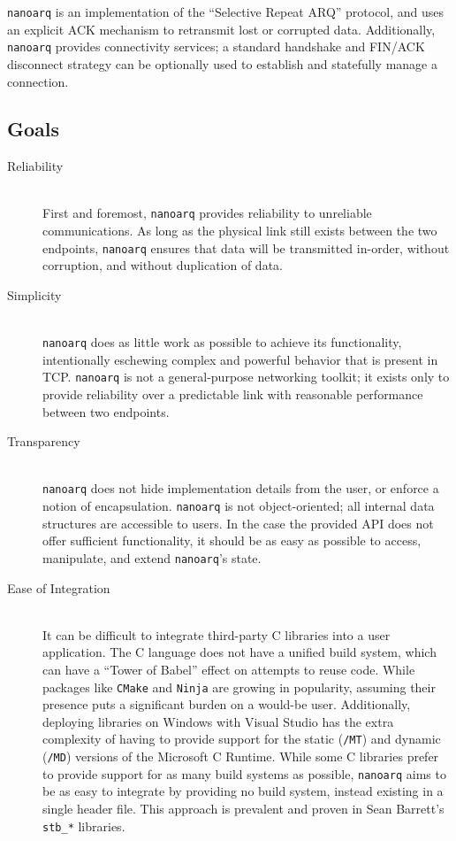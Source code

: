 \documentclass[11pt]{article}
\newcommand{\nanoarq}{\texttt{nanoarq}}
\begin{document}
\nanoarq{} is an implementation of the \enquote{Selective Repeat ARQ} protocol, and uses an explicit ACK mechanism to retransmit lost or corrupted data. Additionally, \nanoarq{} provides connectivity services; a standard handshake and FIN/ACK disconnect strategy can be optionally used to establish and statefully manage a connection.

\subsection{Goals}
\begin{description}
\item[Reliability] \hfill \\
    First and foremost, \nanoarq{} provides reliability to unreliable communications. As long as the physical link still exists between the two endpoints, \nanoarq{} ensures that data will be transmitted in-order, without corruption, and without duplication of data.

\item[Simplicity] \hfill \\
    \nanoarq{} does as little work as possible to achieve its functionality, intentionally eschewing complex and powerful behavior that is present in TCP. \nanoarq{} is not a general-purpose networking toolkit; it exists only to provide reliability over a predictable link with reasonable performance between two endpoints.

\item[Transparency] \hfill \\
    \nanoarq{} does not hide implementation details from the user, or enforce a notion of encapsulation. \nanoarq{} is not object-oriented; all internal data structures are accessible to users. In the case the provided API does not offer sufficient functionality, it should be as easy as possible to access, manipulate, and extend \nanoarq{}'s state.

\item[Ease of Integration] \hfill \\
    It can be difficult to integrate third-party C libraries into a user application. The C language does not have a unified build system, which can have a \enquote{Tower of Babel} effect on attempts to reuse code. While packages like \texttt{CMake} and \texttt{Ninja} are growing in popularity, assuming their presence puts a significant burden on a would-be user. Additionally, deploying libraries on Windows with Visual Studio has the extra complexity of having to provide support for the static (\texttt{/MT}) and dynamic (\texttt{/MD}) versions of the Microsoft C Runtime. While some C libraries prefer to provide support for as many build systems as possible, \nanoarq{} aims to be as easy to integrate by providing no build system, instead existing in a single header file. This approach is prevalent and proven in Sean Barrett's \texttt{stb\_*} libraries. \par


\end{description}
\end{document}
